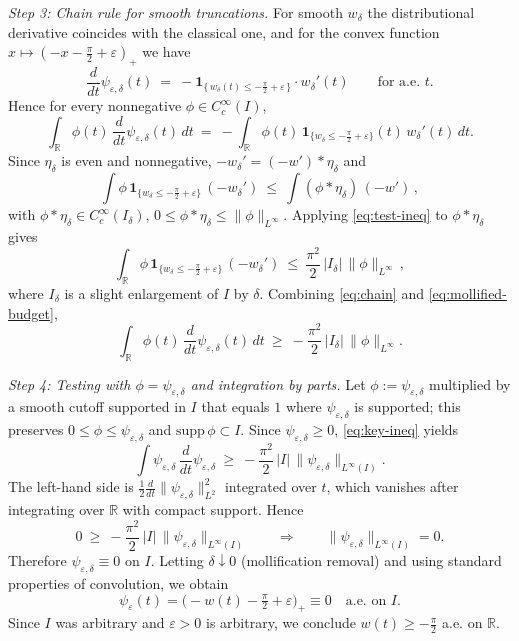 \medskip
\noindent\emph{Step 3: Chain rule for smooth truncations.}
For smooth \(w_\delta\) the distributional derivative coincides with the classical one, and for the convex function \(x\mapsto ( -x-\tfrac{\pi}{2}+\varepsilon)_+\) we have
\[
 \frac{d}{dt}\psi_{\varepsilon,\delta}(t)\ =\ -\mathbf 1_{\{\,w_\delta(t)\le -\tfrac{\pi}{2}+\varepsilon\,\}}\cdot w_\delta'(t)\qquad\text{for a.e. }t.
\]
Hence for every nonnegative \(\phi\in C_c^\infty(I)\),
\begin{equation}\label{eq:chain}
\int_{\mathbb R} \phi(t)\,\frac{d}{dt}\psi_{\varepsilon,\delta}(t)\,dt\ =\ -\int_{\mathbb R} \phi(t)\,\mathbf 1_{\{w_\delta\le -\tfrac{\pi}{2}+\varepsilon\}}(t)\,w_\delta'(t)\,dt.
\end{equation}
Since \(\eta_\delta\) is even and nonnegative, \(-w_\delta'=(-w')*\eta_\delta\) and
\[
 \int \phi\,\mathbf 1_{\{w_\delta\le -\tfrac{\pi}{2}+\varepsilon\}}\,(-w_\delta')\ \le\ \int (\phi*\eta_\delta)\,(-w')\,,
\]
with \(\phi*\eta_\delta\in C_c^\infty(I_\delta)\), \(0\le \phi*\eta_\delta\le \|\phi\|_{L^\infty}\). Applying \eqref{eq:test-ineq} to \(\phi*\eta_\delta\) gives
\begin{equation}\label{eq:mollified-budget}
\int_{\mathbb R} \phi\,\mathbf 1_{\{w_\delta\le -\tfrac{\pi}{2}+\varepsilon\}}\,(-w_\delta')\ \le\ \frac{\pi^2}{2}\,|I_\delta|\,\|\phi\|_{L^\infty}\,,
\end{equation}
where \(I_\delta\) is a slight enlargement of \(I\) by \(\delta\). Combining \eqref{eq:chain} and \eqref{eq:mollified-budget},
\begin{equation}\label{eq:key-ineq}
\int_{\mathbb R} \phi(t)\,\frac{d}{dt}\psi_{\varepsilon,\delta}(t)\,dt\ \ge\ -\frac{\pi^2}{2}\,|I_\delta|\,\|\phi\|_{L^\infty}.
\end{equation}


\medskip
\noindent\emph{Step 4: Testing with \(\phi=\psi_{\varepsilon,\delta}\) and integration by parts.}
Let \(\phi:=\psi_{\varepsilon,\delta}\) multiplied by a smooth cutoff supported in \(I\) that equals \(1\) where \(\psi_{\varepsilon,\delta}\) is supported; this preserves \(0\le\phi\le \psi_{\varepsilon,\delta}\) and \(\mathrm{supp}\,\phi\subset I\). Since \(\psi_{\varepsilon,\delta}\ge 0\), \eqref{eq:key-ineq} yields
\[
 \int \psi_{\varepsilon,\delta}\,\frac{d}{dt}\psi_{\varepsilon,\delta}\ \ge\ -\frac{\pi^2}{2}\,|I|\,\|\psi_{\varepsilon,\delta}\|_{L^\infty(I)}.
\]
The left-hand side is \(\tfrac12\frac{d}{dt}\|\psi_{\varepsilon,\delta}\|_{L^2}^2\) integrated over \(t\), which vanishes after integrating over \(\mathbb R\) with compact support. Hence
\[
 0\ \ge\ -\frac{\pi^2}{2}\,|I|\,\|\psi_{\varepsilon,\delta}\|_{L^\infty(I)}\qquad\Longrightarrow\qquad \|\psi_{\varepsilon,\delta}\|_{L^\infty(I)}=0.
\]
Therefore \(\psi_{\varepsilon,\delta}\equiv 0\) on \(I\). Letting \(\delta\downarrow 0\) (mollification removal) and using standard properties of convolution, we obtain
\[
 \psi_\varepsilon(t)=\bigl(-w(t)-\tfrac{\pi}{2}+\varepsilon\bigr)_+\equiv 0\quad\text{a.e. on }I.
\]
Since \(I\) was arbitrary and \(\varepsilon>0\) is arbitrary, we conclude \(w(t)\ge -\tfrac{\pi}{2}\) a.e. on \(\mathbb R\).


